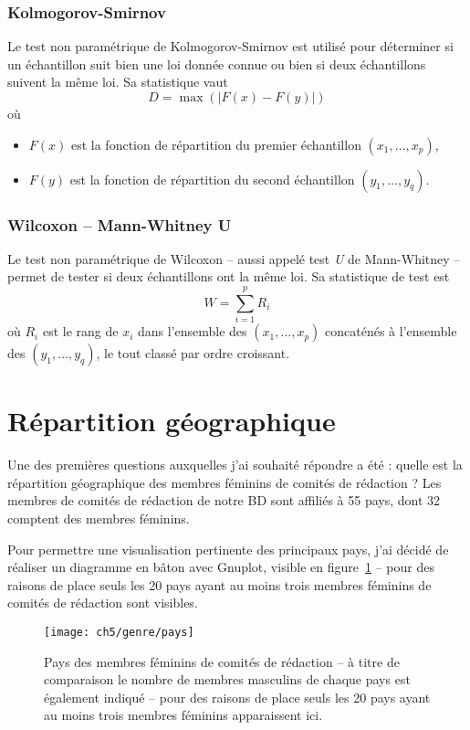 			\subsubsection{Kolmogorov-Smirnov \citep{ks}}
				Le test non paramétrique de Kolmogorov-Smirnov est utilisé pour déterminer si un échantillon suit bien une loi donnée connue ou bien si deux échantillons suivent la même loi. Sa statistique  vaut
			\[ D = \max\left(|F(x) - F(y)|\right)\]
			où
			\begin{itemize}
				\item $F(x)$ est la fonction de répartition du premier échantillon $(x_1, …, x_p)$,
				\item $F(y)$ est la fonction de répartition du second échantillon $(y_1, …, y_q)$.
			\end{itemize}
			
			
			\subsubsection{Wilcoxon -- Mann-Whitney U \citep{wmw}}
				Le test non paramétrique de Wilcoxon -- aussi appelé test \emph{U} de Mann-Whitney -- permet de tester si deux échantillons ont la même loi. Sa statistique de test est
			\[ W = \sum_{i=1}^pR_i \]
			où $R_i$ est le rang de $x_i$ dans l'ensemble des $(x_1, …, x_p)$ concaténés à l'ensemble des $(y_1, …, y_q)$, le tout classé par ordre croissant.

	
	\section{Répartition géographique}
		Une des premières questions auxquelles j'ai souhaité répondre a été : quelle est la répartition géographique des membres féminins de comités de rédaction ? Les membres de comités de rédaction de notre BD sont affiliés à 55 pays, dont 32 comptent des membres féminins.
		
		Pour permettre une visualisation pertinente des principaux pays, j’ai décidé de réaliser un diagramme en bâton avec Gnuplot, visible en figure~\ref{fig:pays} -- pour des raisons de place seuls les  20 pays ayant au moins trois membres féminins de comités de rédaction sont visibles.
			
		\begin{figure}[p]
			\centering
			\texttt{[image: ch5/genre/pays]}
			\caption{Pays des membres féminins de comités de rédaction -- à titre de
comparaison le nombre de membres masculins de chaque pays est également indiqué -- pour des raisons de place seuls les 20 pays ayant au moins trois membres féminins apparaissent ici.}\label{fig:pays}
		\end{figure}
			
